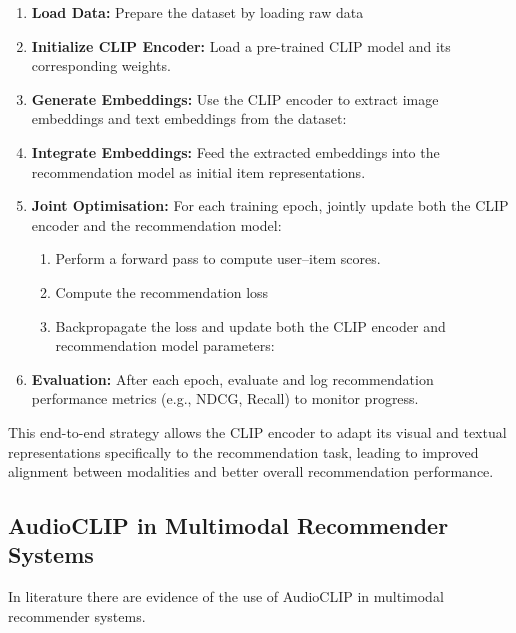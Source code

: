 \begin{enumerate}
    \item \textbf{Load Data:} Prepare the dataset by loading raw data
    
    \item \textbf{Initialize CLIP Encoder:} Load a pre-trained CLIP model and its corresponding weights.
    
    \item \textbf{Generate Embeddings:} Use the CLIP encoder to extract image embeddings and text embeddings from the dataset:
    
    \item \textbf{Integrate Embeddings:} Feed the extracted embeddings into the recommendation model as initial item representations.
    
    \item \textbf{Joint Optimisation:} For each training epoch, jointly update both the CLIP encoder and the recommendation model:
    \begin{enumerate}
        \item Perform a forward pass to compute user--item scores.
        \item Compute the recommendation loss 
        \item Backpropagate the loss and update both the CLIP encoder and recommendation model parameters:
    \end{enumerate}
    \item \textbf{Evaluation:} After each epoch, evaluate and log recommendation performance metrics (e.g., NDCG, Recall) to monitor progress.
\end{enumerate}

This end-to-end strategy allows the CLIP encoder to adapt its visual and textual representations specifically to the recommendation task, leading to improved alignment between modalities and better overall recommendation performance.
\subsection{AudioCLIP in Multimodal Recommender Systems}
In literature there are evidence of the use of AudioCLIP in multimodal recommender systems.
